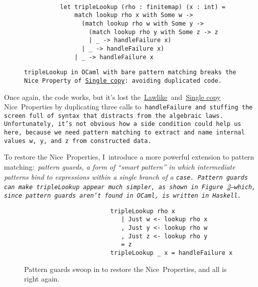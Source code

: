 \documentclass[manuscript,screen 12pt, nonacm]{acmart}
\begin{document}
    \begin{figure}[ht]
        \begin{verbatim}

          let tripleLookup (rho : finitemap) (x : int) =
              match lookup rho x with Some w -> 
                (match lookup rho w with Some y -> 
                  (match lookup rho y with Some z -> z
                  | _ -> handleFailure x)
                | _ -> handleFailure x)
              | _ -> handleFailure x
            \end{verbatim}
        \caption{\tt{tripleLookup} in OCaml with bare pattern matching breaks
         the Nice~Property of~\hyperref[p2]{Single copy}: avoiding duplicated
         code.} 
                    
        \label{fig:pmtriplelookup}
    \end{figure}

    Once again, the code works, but it's lost
    the~\hyperref[p1]{Lawlike}~and~\hyperref[p2]{Single copy} Nice~Properties by
    duplicating three calls to~\tt{handleFailure} and stuffing the screen full
    of syntax that distracts from the algebraic laws. Unfortunately, it's not
    obvious how a side condition could help us here, because we need pattern
    matching to extract and name internal values~\tt{w},~\tt{y}, and~\tt{z}
    from constructed data.

    To restore the Nice~Properties, I~introduce a more powerful extension to
    pattern matching:~\it{pattern guards}, a form of “smart pattern” in which
    intermediate patterns bind to expressions within a single branch of a
    \tt{case}. Pattern guards can make~\tt{tripleLookup} appear~\it{much}
    simpler, as shown in Figure~\ref{fig:guardtriplelookup}---which, since
    pattern guards aren't found in OCaml, is written in Haskell.

    \begin{figure}
        \begin{center}
        \begin{verbatim}
                        tripleLookup rho x
                           | Just w <- lookup rho x
                           , Just y <- lookup rho w
                           , Just z <- lookup rho y
                           = z
                        tripleLookup _ x = handleFailure x
        \end{verbatim}
        \end{center}    
    \caption{Pattern guards swoop in to restore the Nice~Properties, and all is
    right again.} 
    \label{fig:guardtriplelookup}
    \end{figure}
\end{document}
